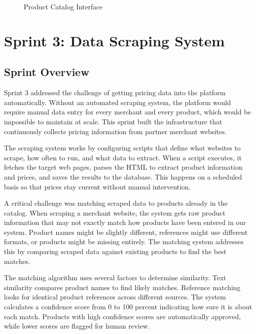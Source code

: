 \begin{figure}[H]
\begin{center}
\end{center}
\caption{Product Catalog Interface}
\label{fig:catalog_interface}
\end{figure}

\section*{Sprint 3: Data Scraping System}

\subsection*{Sprint Overview}

Sprint 3 addressed the challenge of getting pricing data into
the platform automatically. Without an automated scraping system,
the platform would require manual data entry for every merchant
and every product, which would be impossible to maintain at scale.
This sprint built the infrastructure that continuously collects
pricing information from partner merchant websites.

The scraping system works by configuring scripts that define
what websites to scrape, how often to run, and what data to
extract. When a script executes, it fetches the target web pages,
parses the HTML to extract product information and prices, and
saves the results to the database. This happens on a scheduled
basis so that prices stay current without manual intervention.

A critical challenge was matching scraped data to products already
in the catalog. When scraping a merchant website, the system gets
raw product information that may not exactly match how products
have been entered in our system. Product names might be slightly
different, references might use different formats, or products
might be missing entirely. The matching system addresses this by
comparing scraped data against existing products to find the
best matches.

The matching algorithm uses several factors to determine
similarity. Text similarity compares product names to find
likely matches. Reference matching looks for identical product
references across different sources. The system calculates a
confidence score from 0 to 100 percent indicating how sure it
is about each match. Products with high confidence scores are
automatically approved, while lower scores are flagged for human
review.

